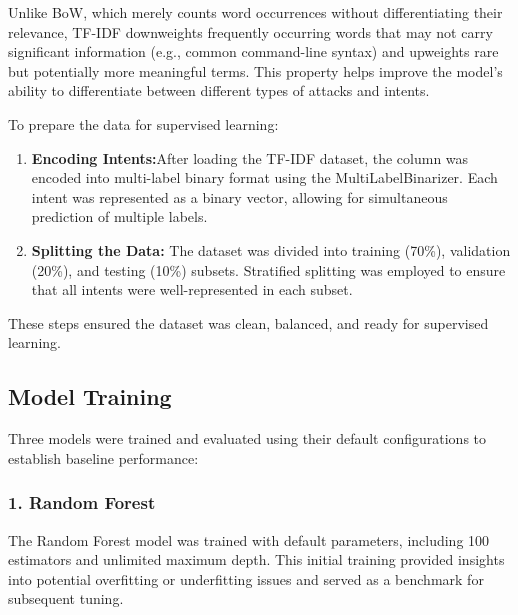         Unlike BoW, which merely counts word occurrences without differentiating their relevance, TF-IDF downweights frequently occurring words that may not carry significant information (e.g., common command-line syntax) and upweights rare but potentially more meaningful terms. This property helps improve the model's ability to differentiate between different types of attacks and intents.
    
        To prepare the data for supervised learning:

        \begin{enumerate}
    
            \item \textbf{Encoding Intents:}After loading the TF-IDF dataset, the  column was encoded into multi-label binary format using the MultiLabelBinarizer. Each intent was represented as a binary vector, allowing for simultaneous prediction of multiple labels.
            
            \item \textbf{Splitting the Data:} The dataset was divided into training (70\%), validation (20\%), and testing (10\%) subsets. Stratified splitting was employed to ensure that all intents were well-represented in each subset.
        
        \end{enumerate}

        These steps ensured the dataset was clean, balanced, and ready for supervised learning.

    \subsection{Model Training}
    
        Three models were trained and evaluated using their default configurations to establish baseline performance:

        \subsubsection*{1. Random Forest \\}
        
        
            The Random Forest model was trained with default parameters, including 100 estimators and unlimited maximum depth. This initial training provided insights into potential overfitting or underfitting issues and served as a benchmark for subsequent tuning.

